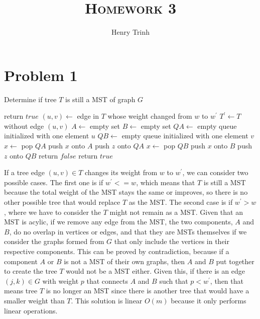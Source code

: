 \documentclass[12pt]{article}
\title{\textsc{Homework 3}}
\author{Henry Trinh}
\begin{document}
\maketitle

\newpage
\section*{Problem 1}
\vspace*{-0.3in}
\begin{algorithm}
\caption{Determine if tree $T$ is still a MST of graph $G$}
\begin{algorithmic}[1]
        \State return $true$
    \EndIf
    \State
    \State $(u,v) \gets $ edge in $T$ whose weight changed from $w$ to $w^\prime$
    \State $T^\prime \gets T$ without edge $(u,v)$ 
    \State $A \gets$ empty set 
    \State $B \gets$ empty set 
    \State $QA \gets$ empty queue initialized with one element $u$
    \State $QB \gets$ empty queue initialized with one element $v$
    \State
        \State $x \gets$ pop $QA$
        \State push $x$ onto $A$
            \State push $z$ onto $QA$
        \EndFor
    \EndWhile
    \State 
        \State $x \gets$ pop $QB$
        \State push $x$ onto $B$
            \State push $z$ onto $QB$
        \EndFor
    \EndWhile
    \State
                \State return $false$
            \EndIf
        \EndIf
    \EndFor
    \State return $true$
\end{algorithmic}
\end{algorithm}
If a tree edge $(u,v) \in T$ changes its weight from $w$ to $w^\prime$, we can consider
two possible cases. The first one is if $w^\prime <= w$, which means that $T$ is still a 
MST because the total weight of the MST stays the same or improves, so there is no other possible
tree that would replace $T$ as the MST. 
\newline
\newline
The second case is if $w^\prime > w$, where we have to consider
the $T$ might not remain as a MST. Given that an MST is acylic, if we remove any edge from the MST,
the two components, $A$ and $B$, do no overlap in vertices or edges, and that they are MSTs themselves if we consider
the graphs formed from $G$ that only include the vertices in their respective components. This can be proved
by contradiction, because if a component $A$ or $B$ is not a MST of their own graphs, then $A$ and $B$ put together to 
create the tree $T$ would not be a MST either. Given this, if there is an edge $(j,k) \in G$ with weight $p$ that connects $A$ and $B$ such that 
$p<w^\prime$, then that means tree $T$ is no longer an MST since there is another tree that would have a smaller weight 
than $T$. This solution is linear $O(m)$ because it only performs linear operations.
\end{document}
